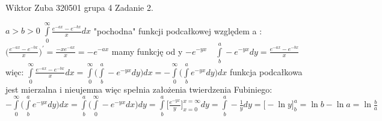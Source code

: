 \documentclass{article}
\begin{document}
Wiktor Zuba 320501 grupa 4
\newline
Zadanie 2.
\newline


$
a>b>0
$
$
\int\limits_{0}^{\infty}
\frac{e^{-ax}-e^{-bx}}{x} dx
$
\newline
"pochodna" funkcji podcałkowej względem a : 
$
\bigl( \frac{e^{-ax}-e^{-bx}}{x} \bigr)^{\prime}
=
\frac{-xe^{-ax}}{x}=-e^{-ax}
$
\newline
mamy funkcję od y 
$
-e^{-yx} \quad
\int\limits_{b}^{a}
-e^{-yx} dy
=
\frac{e^{-ax}-e^{-bx}}{x}
$
więc:
$
\int\limits_{0}^{\infty}
\frac{e^{-ax}-e^{-bx}}{x} dx
=
\int\limits_{0}^{\infty}
\bigl(
\int\limits_{b}^{a}
-e^{-yx} dy
\bigr)
dx
=
- \int\limits_{0}^{\infty}
\bigl(
\int\limits_{b}^{a}
e^{-yx} dy
\bigr)
dx
$
funkcja podcałkowa jest mierzalna i nieujemna więc spełnia założenia twierdzenia Fubiniego:
\newline
$
- \int\limits_{0}^{\infty}
\bigl(
\int\limits_{b}^{a}
e^{-yx} dy
\bigr)
dx
=
\int\limits_{b}^{a}
\bigl(
\int\limits_{0}^{\infty}
-e^{-yx} dx
\bigr)
dy
=
\int\limits_{b}^{a}
\bigl[
\frac{e^{-yx}}{y}
\bigr]_{x=0}^{x=\infty} dy
=
\int\limits_{b}^{a} -\frac{1}{y} dy
=
\bigl[-\ln{y}
\bigr]_{b}^{a}
=
\ln{b}-\ln{a}=
\ln{\frac{b}{a}}
$
\end{document}
